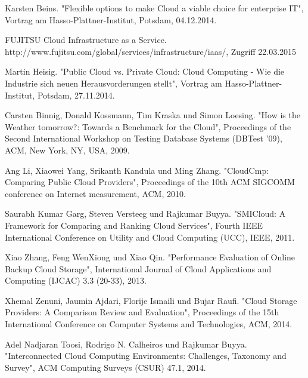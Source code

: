 \ifCLASSOPTIONcaptionsoff
  \newpage
\fi

\begin{thebibliography}{1}

Karsten Beins. "Flexible options to make Cloud a viable choice for enterprise IT", Vortrag am Hasso-Plattner-Institut, Potsdam, 04.12.2014.

FUJITSU Cloud Infrastructure as a Service. http://www.fujitsu.com/global/services/infrastructure/iaas/, Zugriff 22.03.2015
  
Martin Heisig. "Public Cloud vs. Private Cloud: Cloud Computing - Wie die Industrie sich neuen Herausvorderungen stellt", Vortrag am Hasso-Plattner-Institut, Potsdam, 27.11.2014.

Carsten Binnig, Donald Kossmann, Tim Kraska und Simon Loesing. "How is the Weather tomorrow?: Towards a Benchmark for the Cloud", Proceedings of the Second International Workshop on Testing Database Systems (DBTest '09), ACM, New York, NY, USA, 2009.

Ang Li, Xiaowei Yang, Srikanth Kandula und Ming Zhang. "CloudCmp: Comparing Public Cloud Providers", Proceedings of the 10th ACM SIGCOMM conference on Internet measurement, ACM, 2010.

Saurabh Kumar Garg, Steven Versteeg und Rajkumar Buyya. "SMICloud: A Framework for Comparing and Ranking Cloud Services", Fourth IEEE International Conference on Utility and Cloud Computing (UCC), IEEE, 2011.

Xiao Zhang, Feng WenXiong und Xiao Qin. "Performance Evaluation of Online Backup Cloud Storage", International Journal of Cloud Applications and Computing (IJCAC) 3.3 (20-33), 2013.

Xhemal Zenuni, Jaumin Ajdari, Florije Ismaili und Bujar Raufi. "Cloud Storage Providers: A Comparison Review and Evaluation", Proceedings of the 15th International Conference on Computer Systems and Technologies, ACM, 2014.

Adel Nadjaran Toosi, Rodrigo N. Calheiros und Rajkumar Buyya. "Interconnected Cloud Computing Environments: Challenges, Taxonomy and Survey", ACM Computing Surveys (CSUR) 47.1, 2014.

\end{thebibliography}